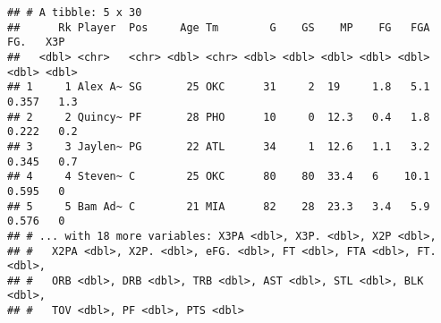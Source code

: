 \documentclass[]{article}
\newenvironment{Shaded}{\begin{snugshade}}{\end{snugshade}}
\newcommand{\KeywordTok}[1]{\textcolor[rgb]{0.13,0.29,0.53}{\textbf{#1}}}
\newcommand{\DecValTok}[1]{\textcolor[rgb]{0.00,0.00,0.81}{#1}}
\newcommand{\StringTok}[1]{\textcolor[rgb]{0.31,0.60,0.02}{#1}}
\newcommand{\CommentTok}[1]{\textcolor[rgb]{0.56,0.35,0.01}{\textit{#1}}}
\newcommand{\OperatorTok}[1]{\textcolor[rgb]{0.81,0.36,0.00}{\textbf{#1}}}
\newcommand{\NormalTok}[1]{#1}
\begin{document}
\begin{Shaded}
\end{Shaded}

\begin{verbatim}
## # A tibble: 5 x 30
##      Rk Player  Pos     Age Tm        G    GS    MP    FG   FGA   FG.   X3P
##   <dbl> <chr>   <chr> <dbl> <chr> <dbl> <dbl> <dbl> <dbl> <dbl> <dbl> <dbl>
## 1     1 Alex A~ SG       25 OKC      31     2  19     1.8   5.1 0.357   1.3
## 2     2 Quincy~ PF       28 PHO      10     0  12.3   0.4   1.8 0.222   0.2
## 3     3 Jaylen~ PG       22 ATL      34     1  12.6   1.1   3.2 0.345   0.7
## 4     4 Steven~ C        25 OKC      80    80  33.4   6    10.1 0.595   0  
## 5     5 Bam Ad~ C        21 MIA      82    28  23.3   3.4   5.9 0.576   0  
## # ... with 18 more variables: X3PA <dbl>, X3P. <dbl>, X2P <dbl>,
## #   X2PA <dbl>, X2P. <dbl>, eFG. <dbl>, FT <dbl>, FTA <dbl>, FT. <dbl>,
## #   ORB <dbl>, DRB <dbl>, TRB <dbl>, AST <dbl>, STL <dbl>, BLK <dbl>,
## #   TOV <dbl>, PF <dbl>, PTS <dbl>
\end{verbatim}

\begin{Shaded}
\end{Shaded}
\end{document}
